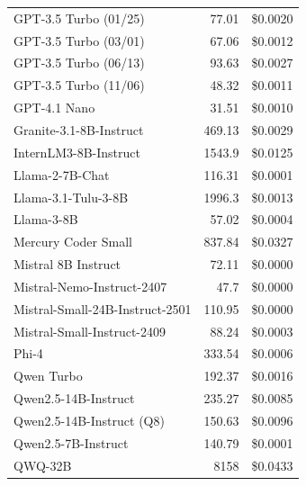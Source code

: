 \documentclass[11pt]{article}
\begin{document}
\begin{table}[htbp]
{\begin{tabular}{lrr}
GPT-3.5 Turbo (01/25) & 77.01 & \$0.0020 \\
GPT-3.5 Turbo (03/01) & 67.06 & \$0.0012 \\
GPT-3.5 Turbo (06/13) & 93.63 & \$0.0027 \\
GPT-3.5 Turbo (11/06) & 48.32 & \$0.0011 \\
GPT-4.1 Nano & 31.51 & \$0.0010 \\
Granite-3.1-8B-Instruct & 469.13 & \$0.0029 \\
InternLM3-8B-Instruct & 1543.9 & \$0.0125 \\
Llama-2-7B-Chat & 116.31 & \$0.0001 \\
Llama-3.1-Tulu-3-8B & 1996.3 & \$0.0013 \\
Llama-3-8B & 57.02 & \$0.0004 \\
Mercury Coder Small & 837.84 & \$0.0327 \\
Mistral 8B Instruct & 72.11 & \$0.0000 \\
Mistral-Nemo-Instruct-2407 & 47.7 & \$0.0000 \\
Mistral-Small-24B-Instruct-2501 & 110.95 & \$0.0000 \\
Mistral-Small-Instruct-2409 & 88.24 & \$0.0003 \\
Phi-4 & 333.54 & \$0.0006 \\
Qwen Turbo & 192.37 & \$0.0016 \\
Qwen2.5-14B-Instruct & 235.27 & \$0.0085 \\
Qwen2.5-14B-Instruct (Q8) & 150.63 & \$0.0096 \\
Qwen2.5-7B-Instruct & 140.79 & \$0.0001 \\
QWQ-32B & 8158 & \$0.0433 \\
\bottomrule
\end{tabular}
}
\end{table}
\end{document}
